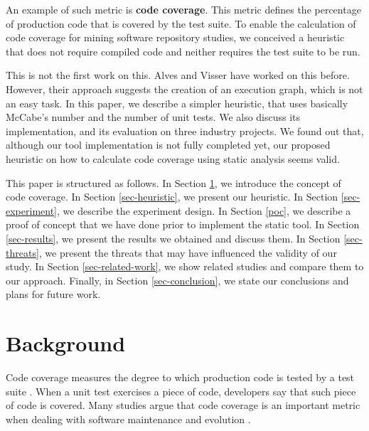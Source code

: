 \documentclass{sig-alternate}
\begin{document}
An example of such metric is \textbf{code coverage}. 
This metric defines the percentage of production code that is covered 
by the test suite. To enable the calculation of code coverage for mining software
repository studies, we conceived a heuristic that does not require compiled code
and neither requires the test suite to be run. 

This is not the first work on this. Alves and Visser \cite{tiago} have worked on this
before. However, their approach suggests the creation of an execution graph, which is
not an easy task.
In this paper, we describe a simpler heuristic, that uses 
basically McCabe's number \cite{mccabe} and the number of unit tests.
We also discuss its implementation, and its evaluation on three industry projects. 
We found out that, although our tool implementation is not fully completed yet, our 
proposed heuristic on how to calculate code coverage using static analysis seems valid. 

This paper is structured as follows. In Section \ref{sec-code-coverage}, 
we introduce the concept of code coverage. In Section \ref{sec-heuristic}, 
we present our heuristic. In Section \ref{sec-experiment}, we describe the 
experiment design. In Section \ref{poc}, we describe a proof of concept that
we have done prior to implement the static tool. 
In Section \ref{sec-results}, we present the results we 
obtained and discuss them. In Section \ref{sec-threats}, 
we present the threats that may have influenced the validity of our study. 
In Section \ref{sec-related-work}, we show related studies and compare them 
to our approach. Finally, in Section \ref{sec-conclusion}, we state our 
conclusions and plans for future work.


\section{Background}
\label{sec-code-coverage}

Code coverage measures the degree to which production code is tested by a test suite \cite{code-coverage}. 
When a unit test exercises a piece of code, developers say that such piece
of code is covered. Many studies argue that code coverage is an important
metric when dealing with software maintenance and evolution \cite{sebastian} \cite{del-frate} \cite{mei-hwa}.
\end{document}
